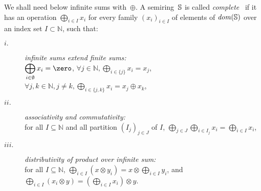 \noindent
{}
We shall need below infinite sums with~$\oplus$.
A semiring~$\mathbb{S}$ is called \emph{complete}~\cite{Droste09handbook}
if it has an %
operation $\bigoplus_{i \in I} x_i$
for every family
$(x_i)_{i \in I}$ %
of elements of $\mathit{dom}(\mathbb{S})$ over an index set $I \subset \mathbb{N}$, such that:
\begin{description}
\item[$i.$]
\emph{infinite sums extend finite sums:}\\
$\displaystyle\bigoplus_{i \in \emptyset} x_i = \zero$,\quad
      $\forall j\in \mathbb{N}, \displaystyle\bigoplus_{i \in \{ j \}} x_i = x_j$,
      $\forall j, k\in \mathbb{N}, j\neq k,
      \displaystyle\bigoplus_{i \in \{ j, k \}} x_i = x_j \oplus x_k$,
%
\item[$ii.$]
\emph{associativity and commutativity:}\\
for all $I \subseteq \mathbb{N}$
and all partition $(I_{j})_{j \in J}$ of $I$, %
\(
\displaystyle
\bigoplus_{j \in J}\bigoplus_{i \in I_j} x_i =
\bigoplus_{i \in I} x_i
\),
%
\item[$iii.$]
\emph{distributivity of product over infinite sum:}\\
for all $I \subseteq \mathbb{N}$,
\(
\displaystyle
\bigoplus_{i \in I} (x \otimes y_i) = x \otimes \bigoplus_{i\in I} y_i\), and
\(
\displaystyle
\bigoplus_{i \in I} (x_i \otimes y) = (\bigoplus_{i \in I} x_i ) \otimes y\).
\end{description}





